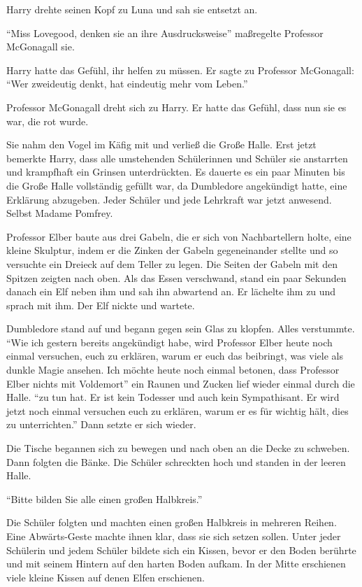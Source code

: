 Harry drehte seinen Kopf zu Luna und sah sie entsetzt an.

\enquote{Miss Lovegood, denken sie an ihre Ausdrucksweise} maßregelte Professor McGonagall sie.

Harry hatte das Gefühl, ihr helfen zu müssen. Er sagte zu Professor McGonagall: \enquote{Wer zweideutig denkt, hat eindeutig mehr vom Leben.}

Professor McGonagall dreht sich zu Harry. Er hatte das Gefühl, dass nun sie es war, die rot wurde.

Sie nahm den Vogel im Käfig mit und verließ die Große Halle. Erst jetzt bemerkte Harry, dass alle umstehenden Schülerinnen und Schüler sie anstarrten und krampfhaft ein Grinsen unterdrückten. Es dauerte es ein paar Minuten bis die Große Halle vollständig gefüllt war, da Dumbledore angekündigt hatte, eine Erklärung abzugeben. Jeder Schüler und jede Lehrkraft war jetzt anwesend. Selbst Madame Pomfrey.

Professor Elber baute aus drei Gabeln, die er sich von Nachbartellern holte, eine kleine Skulptur, indem er die Zinken der Gabeln gegeneinander stellte und so versuchte ein Dreieck auf dem Teller zu legen. Die Seiten der Gabeln mit den Spitzen zeigten nach oben. Als das Essen verschwand, stand ein paar Sekunden danach ein Elf neben ihm und sah ihn abwartend an. Er lächelte ihm zu und sprach mit ihm. Der Elf nickte und wartete.

Dumbledore stand auf und begann gegen sein Glas zu klopfen. Alles verstummte. \enquote{Wie ich gestern bereits angekündigt habe, wird Professor Elber heute noch einmal versuchen, euch zu erklären, warum er euch das beibringt, was viele als dunkle Magie ansehen. Ich möchte heute noch einmal betonen, dass Professor Elber nichts mit Voldemort\abs} ein Raunen und Zucken lief wieder einmal durch die Halle. \enquote{\aabs zu tun hat. Er ist kein Todesser und auch kein Sympathisant. Er wird jetzt noch einmal versuchen euch zu erklären, warum er es für wichtig hält, dies zu unterrichten.} Dann setzte er sich wieder.

Die Tische begannen sich zu bewegen und nach oben an die Decke zu schweben. Dann folgten die Bänke. Die Schüler schreckten hoch und standen in der leeren Halle.

\enquote{Bitte bilden Sie alle einen großen Halbkreis.}

Die Schüler folgten und machten einen großen Halbkreis in mehreren Reihen. Eine Abwärts-Geste machte ihnen  klar, dass sie sich setzen sollen. Unter jeder Schülerin und jedem Schüler bildete sich ein Kissen, bevor er den Boden berührte und mit seinem Hintern auf den harten Boden aufkam. In der Mitte erschienen viele kleine Kissen auf denen Elfen erschienen.

